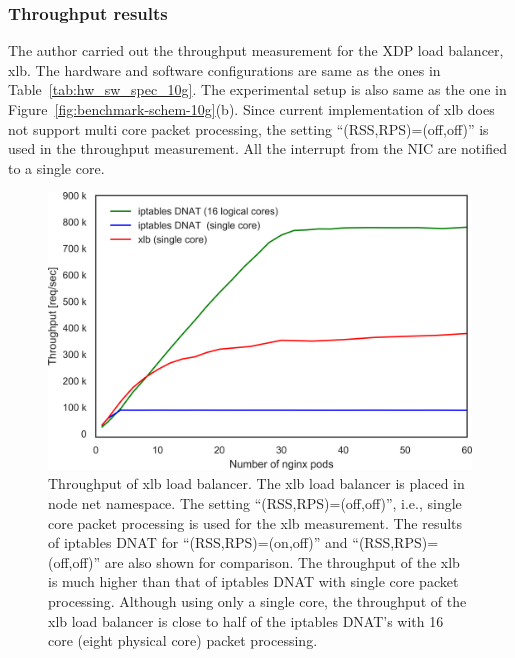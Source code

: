 
\subsubsection{Throughput results }

The author carried out the throughput measurement for the XDP load balancer, xlb.
The hardware and software configurations are same as the ones in Table~\ref{tab:hw_sw_spec_10g}.
The experimental setup is also same as the one in Figure~\ref{fig:benchmark-schem-10g}(b).
Since current implementation of xlb does not support multi core packet processing, the setting \enquote{(RSS,RPS)=(off,off)} is used in the throughput measurement.
All the interrupt from the NIC are notified to a single core.

\begin{figure}[h]
  \centering
  \includegraphics[width=0.9\columnwidth]{Figs/xlb_iptables_dnat_10g}
  \par\bigskip
  \centering
  \begin{minipage}{0.9\columnwidth}
    \caption[Throughput of xlb load balancer]{
      Throughput of xlb load balancer.
      The xlb load balancer is placed in node net namespace.
      The setting \enquote{(RSS,RPS)=(off,off)}, i.e., single core packet processing is used for the xlb measurement.
      The results of iptables DNAT for \enquote{(RSS,RPS)=(on,off)} and \enquote{(RSS,RPS)=(off,off)} are also shown for comparison.
      The throughput of the xlb is much higher than that of iptables DNAT with single core packet processing.
      Although using only a single core, the throughput of the xlb load balancer is close to half of the iptables DNAT's with 16 core (eight physical core) packet processing.
    }
    \label{fig:xlb_iptables_dnat_10g}
  \end{minipage}
\end{figure}

